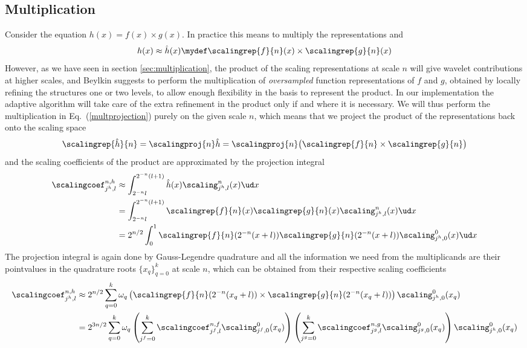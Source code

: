 \subsection{Multiplication}
Consider the equation $h(x) = f(x)\times g(x)$. In practice this means to
multiply the representations  and 
\begin{equation}
    h(x) \approx \hat{h}(x) \mydef \scalingrep{f}{n}(x) 
	    \times \scalingrep{g}{n}(x)\\
\end{equation}
However, as we have seen in section \ref{sec:multiplication}, the product of the
scaling representations at scale $n$ will give wavelet contributions at higher
scales, and Beylkin \cite{Beylkin} suggests to perform the multiplication of 
\emph{oversampled} function representations of $f$ and $g$, obtained 
by locally refining the \tree structures one or two levels, to allow enough
flexibility in the basis to represent the product. In our implementation the 
adaptive algorithm will take care of the extra refinement in the product only
if and where it is necessary. We will thus perform the multiplication in 
Eq.~(\ref{multprojection}) purely on the given scale $n$, which means that we
project the product of the representations back onto the scaling space 
\begin{equation}
    \scalingrep{\hat{h}}{n} = \scalingproj{n} \hat{h}
	= \scalingproj{n}\big(\scalingrep{f}{n} \times \scalingrep{g}{n}\big)
\end{equation}
and the scaling coefficients of the product are approximated by the projection 
integral
\begin{align}
    \scalingcoef^{n,h}_{j^h,l} 
	&\approx \int_{2^{-n}l}^{2^{-n}(l+1)}
	    \hat{h}(x)\scaling_{j^h,l}^n(x)\ud x\\
	&= \int_{2^{-n}l}^{2^{-n}(l+1)}
	    \scalingrep{f}{n}(x)\scalingrep{g}{n}(x)\scaling^n_{j^h,l}(x)\ud x\\
	&= 2^{n/2} \int_0^1
	    \scalingrep{f}{n}(2^{-n}(x+l))
	    \scalingrep{g}{n}(2^{-n}(x+l))\scaling^0_{j^h,0}(x)\ud x
    \label{eq:multexpansion}
\end{align}
The projection integral is again done by Gauss-Legendre quadrature and all the 
information we need from the multiplicands are their pointvalues in the quadrature 
roots $\lbrace x_q\rbrace_{q=0}^k$ at scale $n$, which can be obtained from their
respective scaling coefficients
\begin{align}
    \scalingcoef^{n,h}_{j^h,l} &\approx 2^{n/2}
	\sum_{q=0}^k \omega_q\left(\scalingrep{f}{n}(2^{-n}(x_q+l))\times 
        \scalingrep{g}{n}(2^{-n}(x_q+l))\right) \scaling^0_{j^h,0}(x_q)\\
	&= 2^{3n/2}\sum_{q=0}^k \omega_q 
	\left(\sum_{j^f=0}^k\scalingcoef^{n,f}_{j^f,l}\scaling^0_{j^f,0}(x_q)\right)
	\left(\sum_{j^g=0}^k\scalingcoef^{n,g}_{j^g,l}\scaling^0_{j^g,0}(x_q)\right)
	\scaling^0_{j^h,0}(x_q)
	\label{eq:nmult}
\end{align}


